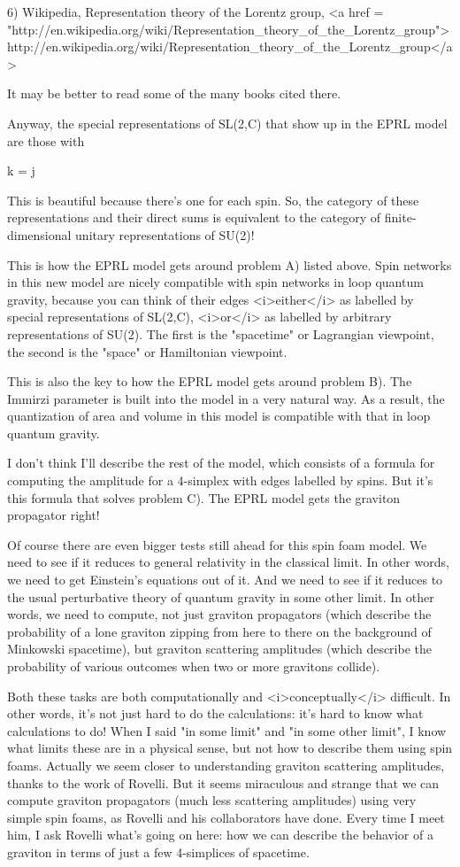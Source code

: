 6) Wikipedia, Representation theory of the Lorentz group,
<a href = "http://en.wikipedia.org/wiki/Representation_theory_of_the_Lorentz_group">http://en.wikipedia.org/wiki/Representation_theory_of_the_Lorentz_group</a>

It may be better to read some of the many books cited there.

Anyway, the special representations of SL(2,C) that show up in the
EPRL model are those with 

k = \gamma  j

This is beautiful because there's one for each spin.  So, the category
of these representations and their direct sums is equivalent to the
category of finite-dimensional unitary representations of SU(2)!

This is how the EPRL model gets around problem A) listed above.  Spin
networks in this new model are nicely compatible with spin networks in
loop quantum gravity, because you can think of their edges
<i>either</i> as labelled by special representations of SL(2,C),
<i>or</i> as labelled by arbitrary representations of SU(2).  The
first is the "spacetime" or Lagrangian viewpoint, the second
is the "space" or Hamiltonian viewpoint.

This is also the key to how the EPRL model gets around problem B).  The
Immirzi parameter is built into the model in a very natural way.  As a
result, the quantization of area and volume in this model is
compatible with that in loop quantum gravity.

I don't think I'll describe the rest of the model, which consists of a
formula for computing the amplitude for a 4-simplex with edges
labelled by spins.  But it's this formula that solves problem C).  The
EPRL model gets the graviton propagator right!

Of course there are even bigger tests still ahead for this spin foam
model.  We need to see if it reduces to general relativity in the
classical limit.  In other words, we need to get Einstein's equations
out of it.  And we need to see if it reduces to the usual perturbative
theory of quantum gravity in some other limit.  In other words, we
need to compute, not just graviton propagators (which describe the
probability of a lone graviton zipping from here to there on the
background of Minkowski spacetime), but graviton scattering amplitudes
(which describe the probability of various outcomes when two or more
gravitons collide).  

Both these tasks are both computationally and <i>conceptually</i>
difficult.  In other words, it's not just hard to do the calculations:
it's hard to know what calculations to do!  When I said "in some
limit" and "in some other limit", I know what limits
these are in a physical sense, but not how to describe them using spin
foams.  Actually we seem closer to understanding graviton scattering
amplitudes, thanks to the work of Rovelli.  But it seems miraculous
and strange that we can compute graviton propagators (much less
scattering amplitudes) using very simple spin foams, as Rovelli and
his collaborators have done.  Every time I meet him, I ask Rovelli
what's going on here: how we can describe the behavior of a graviton
in terms of just a few 4-simplices of spacetime.

